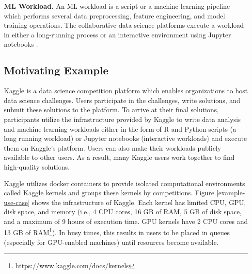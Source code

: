 \textbf{ML Workload.}
An ML workload is a script or a machine learning pipeline which performs several data preprocessing, feature engineering, and model training operations. 
The collaborative data science platforms execute a workload in either a long-running process or an interactive environment using Jupyter notebooks \cite{Kluyver:2016aa}.

\subsection{Motivating Example}\label{subsec-motivational-example}
Kaggle is a data science competition platform which enables organizations to host data science challenges.
Users participate in the challenges, write solutions, and submit these solutions to the platform.
To arrive at their final solutions, participants utilize the infrastructure provided by Kaggle to write data analysis and machine learning workloads either in the form of R and Python scripts (a long running workload) or Jupyter notebooks (interactive workloads) and execute them on Kaggle's platform.
Users can also make their workloads publicly available to other users.
As a result, many Kaggle users work together to find high-quality solutions.

Kaggle utilizes docker containers to provide isolated computational environments called Kaggle kernels and groups these kernels by competitions.
Figure \ref{example-use-case} shows the infrastructure of Kaggle.
Each kernel has limited CPU, GPU, disk space, and memory (i.e., 4 CPU cores, 16 GB of RAM, 5 GB of disk space, and a maximum of 9 hours of execution time. GPU kernels have 2 CPU cores and 13 GB of RAM\footnote{https://www.kaggle.com/docs/kernels}).
In busy times, this results in users to be placed in queues (especially for GPU-enabled machines) until resources become available.

